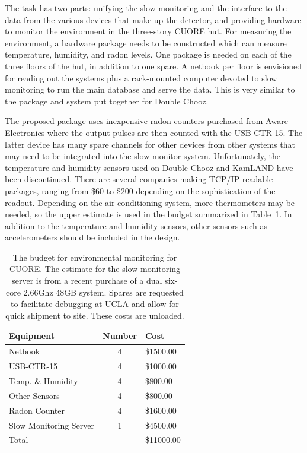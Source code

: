 The task has two parts: unifying the slow monitoring and the interface to the data from the various devices that make up the detector, and providing hardware to monitor the environment in the three-story CUORE hut. For measuring the environment, a hardware package needs to be constructed which can measure temperature, humidity, and radon levels.  One package is needed on each of the three floors of the hut, in addition to one spare. A netbook per floor is envisioned for reading out the systems plus a rack-mounted computer devoted to slow monitoring to run the main database and serve the data. This is very similar to the package and system put together for Double Chooz. 

The proposed package uses inexpensive radon counters purchased from Aware Electronics\cite{aware} where the output pulses are then counted with the USB-CTR-15\cite{usbctr}.  The latter device has many spare channels for other devices from other systems that may need to be integrated into the slow monitor system. Unfortunately, the temperature and humidity sensors used on Double Chooz and KamLAND have been discontinued. There are several companies making TCP/IP-readable packages, ranging from \$60 to \$200 depending on the sophistication of the readout. Depending on the air-conditioning system, more thermometers may be needed, so the upper estimate is used in the budget summarized in Table~\ref{slowRequest}. In addition to the temperature and humidity sensors, other sensors such as accelerometers should be included in the design.

\begin{table}[position specifier]
\begin{center}
\begin{tabular}{ l c l}
\hline
Equipment & Number & Cost \\
\hline
Netbook & 4 & \$1500.00\\
USB-CTR-15 & 4 & \$1000.00\\
Temp. \& Humidity & 4 & \$800.00 \\
Other Sensors & 4 & \$800.00 \\
Radon Counter & 4 & \$1600.00\\
Slow Monitoring Server & 1 & \$4500.00 \\
\hline
Total & & \$11000.00 \\
\hline
\end{tabular}
\caption{\label{slowRequest}The budget for environmental monitoring for CUORE. The estimate for the slow monitoring server is from a recent purchase of a dual six-core 2.66Ghz 48GB system. Spares are requested to facilitate debugging at UCLA and allow for quick shipment to site. These costs are unloaded.}
\end{center}
\end{table}

